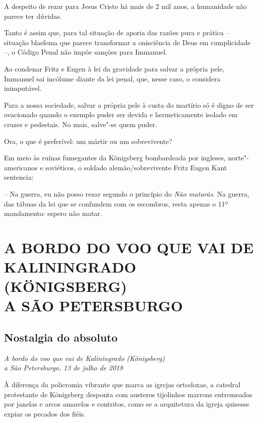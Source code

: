A despeito de rezar para Jesus Cristo há mais de 2 mil anos, a
humanidade não parece ter dúvidas.

Tanto é assim que, para tal situação de aporia das razões pura e prática
-- situação blasfema que parece transformar a onisciência de Deus em
cumplicidade --, o Código Penal não impõe sanções para Immanuel.

Ao condenar Fritz e Eugen à lei da gravidade para salvar a própria pele,
Immanuel sai incólume diante da lei penal, que, nesse caso, o considera
inimputável.

Para a nossa sociedade, salvar a própria pele à custa do martírio só é
digno de ser ovacionado quando o exemplo puder ser devida e
hermeticamente isolado em cruzes e pedestais. No mais, salve"-se quem
puder.

Ora, o que é preferível: um mártir ou um sobrevivente?

Em meio às ruínas fumegantes da Königsberg bombardeada por ingleses,
norte"-americanos e soviéticos, o soldado alemão/sobrevivente Fritz Eugen
Kant sentencia:

-- Na guerra, eu não posso rezar segundo o princípio do \emph{Não
matarás}. Na guerra, das tábuas da lei que se confundem com os
escombros, resta apenas o 11º mandamento: espero não matar.

\clearpage{\pagestyle{empty}\cleardoublepage}
\movetooddpage
{}
\part*{A BORDO DO VOO QUE VAI DE\\KALININGRADO (KÖNIGSBERG)\\A SÃO PETERSBURGO}

\chapter*{Nostalgia do absoluto}

\begin{flushright}
\emph{A bordo do voo que vai de Kaliningrado (Königsberg)\\a São Petersburgo, 13 de julho de 2018}
\end{flushright}

À diferença da policromia vibrante que marca as igrejas ortodoxas, a
catedral protestante de Königsberg desponta com austeros tijolinhos
marrons entremeados por janelas e arcos amarelos e contritos, como se a
arquitetura da igreja quisesse expiar os pecados dos fiéis.

